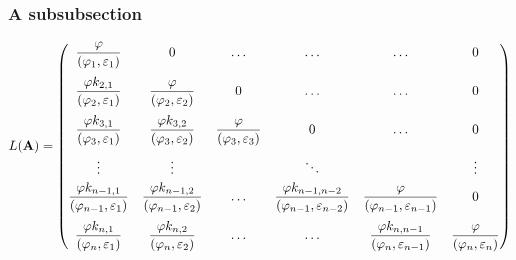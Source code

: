 \subsubsection{A subsubsection}

\newcommand*{\boldA}{\ifpdftex\mathbf{A}\else\symbfup{A}\fi}%

\begin{equation}\label{eqn:WT1}
L(\boldA) = \begin{pmatrix}
\dfrac\varphi{(\varphi_1,\varepsilon_1)}			& 0 												 & \ldots 									& \ldots & \ldots& 0 \\[4\jot]
\dfrac{\varphi k_{2,1}}{(\varphi_2,\varepsilon_1)}	& \dfrac\varphi{(\varphi_2,\varepsilon_2)}			 & 0 										& \ldots & \ldots& 0 \\[4\jot]
\dfrac{\varphi k_{3,1}}{(\varphi_3,\varepsilon_1)}	& \dfrac{\varphi k_{3,2}}{(\varphi_3,\varepsilon_2)} & \dfrac\varphi{(\varphi_3,\varepsilon_3)}	& 0 	 & \ldots& 0 \\[4\jot]
\vdots 												& \vdots 											 & \mbox{ } & \ddots & \mbox{ } & \vdots \\[\jot]
\dfrac{\varphi k_{n-1, 1}}{(\varphi_{n-1},\varepsilon_1)}		& \dfrac{\varphi k_{n-1, 2}}{(\varphi_{n-1},\varepsilon_2)} & \ldots & 
\dfrac{\varphi k_{n-1,n-2}}{(\varphi_{n-1},\varepsilon_{n-2})}	& \dfrac{\varphi}{(\varphi_{n-1},\varepsilon_{n-1})} 		& 0 \\[4\jot]
\dfrac{\varphi k_{n,1}}{(\varphi_n,\varepsilon_1)}				& \dfrac{\varphi k_{n,2}}{(\varphi_n,\varepsilon_2)}		& \ldots & \ldots	&
\dfrac{\varphi k_{n,n-1}}{(\varphi_n,\varepsilon_{n-1})} 		& \dfrac{\varphi}{(\varphi_n,\varepsilon_n)}
\end{pmatrix}
\end{equation}

